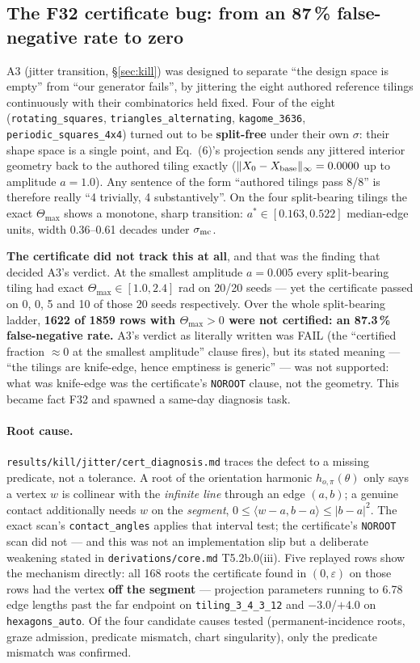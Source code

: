 \documentclass[10pt,a4paper]{article}
\newcommand{\fn}[1]{\nolinkurl{#1}}
\begin{document}
\subsection{The F32 certificate bug: from an 87\,\% false-negative rate to zero}
\label{sec:day3-f32}

A3 (jitter transition, \S\ref{sec:kill}) was designed to separate ``the design space is empty''
from ``our generator fails'', by jittering the eight authored reference tilings continuously with
their combinatorics held fixed. Four of the eight (\fn{rotating\_squares},
\fn{triangles\_alternating}, \fn{kagome\_3636}, \fn{periodic\_squares\_4x4}) turned out to be
\textbf{split-free} under their own $\sigma$: their shape space is a single point, and Eq.~(6)'s
projection sends any jittered interior geometry back to the authored tiling exactly
($\|X_0-X_{\rm base}\|_\infty = 0.0000$ up to amplitude $a=1.0$). Any sentence of the form
``authored tilings pass 8/8'' is therefore really ``4 trivially, 4 substantively''. On the four
split-bearing tilings the exact $\Theta_{\max}$ shows a monotone, sharp transition:
$a^*\in[0.163,0.522]$ median-edge units, width 0.36--0.61 decades under $\sigma_{\rm mc}$.

\textbf{The certificate did not track this at all}, and that was the finding that decided A3's
verdict. At the smallest amplitude $a=0.005$ every split-bearing tiling had exact
$\Theta_{\max}\in[1.0,2.4]$ rad on 20/20 seeds --- yet the certificate passed on 0, 0, 5 and 10 of
those 20 seeds respectively. Over the whole split-bearing ladder, \textbf{1622 of 1859 rows with
$\Theta_{\max}>0$ were not certified: an 87.3\,\% false-negative rate.} A3's verdict as literally
written was FAIL (the ``certified fraction $\approx0$ at the smallest amplitude'' clause fires),
but its stated meaning --- ``the tilings are knife-edge, hence emptiness is generic'' --- was not
supported: what was knife-edge was the certificate's \texttt{NOROOT} clause, not the geometry.
This became fact F32 and spawned a same-day diagnosis task.

\paragraph{Root cause.} \fn{results/kill/jitter/cert\_diagnosis.md} traces the defect to a missing
predicate, not a tolerance. A root of the orientation harmonic $h_{o,\pi}(\theta)$ only says a
vertex $w$ is collinear with the \emph{infinite line} through an edge $(a,b)$; a genuine contact
additionally needs $w$ on the \emph{segment}, $0\le\langle w-a,b-a\rangle\le|b-a|^2$. The exact
scan's \fn{contact\_angles} applies that interval test; the certificate's \texttt{NOROOT} scan did
not --- and this was not an implementation slip but a deliberate weakening stated in
\fn{derivations/core.md} T5.2b.0(iii). Five replayed rows show the mechanism directly: all 168
roots the certificate found in $(0,\varepsilon)$ on those rows had the vertex \textbf{off the
segment} --- projection parameters running to 6.78 edge lengths past the far endpoint on
\fn{tiling\_3\_4\_3\_12} and $-3.0$/$+4.0$ on \fn{hexagons\_auto}. Of the four candidate causes
tested (permanent-incidence roots, graze admission, predicate mismatch, chart singularity), only
the predicate mismatch was confirmed.
\end{document}
